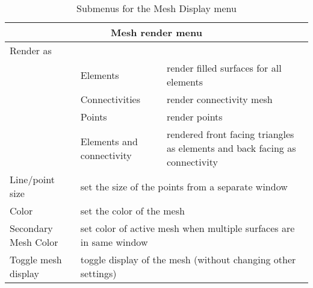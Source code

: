 \begin{table}[ht]
  \begin{center}
    \begin{tabular}{|l|l|p{3 in}|} \hline
      \multicolumn{3}{|c|}{Mesh render menu} \\ \hline \hline
    Render as & & \\
      &  Elements  & render filled surfaces for all elements \\
      &  Connectivities & render connectivity mesh\\ 
      &  Points & render points\\ 
      &  Elements and connectivity & rendered front facing triangles as
            elements and back facing as connectivity \\ \hline 
    Line/point size 
      & \multicolumn{2}{|l|}{set the size of the points from a separate
      window}\\ \hline
    Color 
      & \multicolumn{2}{|l|}{set the color of the mesh}\\ \hline
    Secondary Mesh Color
      & \multicolumn{2}{|l|}{set color of active mesh when multiple 
	surfaces are in same window} \\ \hline
    Toggle mesh display 
      &  \multicolumn{2}{|l|}{toggle display of the mesh (without changing
          other settings)}\\ 
    \hline
    \end{tabular}
  \end{center}
\caption{Submenus for the Mesh Display menu}
\end{table}

